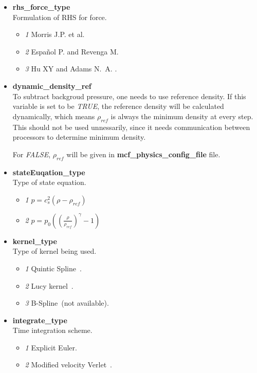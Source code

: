 \documentclass[a4paper,10pt]{article}
\begin{document}
\begin{itemize}
\item
\textbf{rhs\_force\_type} \\
Formulation of RHS for force.
\begin{itemize}
 \item \textit{1} Morris J.P. et al. \cite{Morris1997}
 \item \textit{2} Espa\~{n}ol P. and  Revenga M. \cite{Espanol2003}
 \item \textit{3} Hu XY and Adams N.~A.  \cite{Hu2006a}.
\end{itemize}

\item
\textbf{dynamic\_density\_ref}\\
To subtract backgroud pressure,
one needs to use reference density.
If this variable is set to be \textit{TRUE},
the reference density will be calculated dynamically,
which means \textbf{$\rho_{ref}$} is always the minimum
density at every step.
This should not be used unnessarily,
since it needs communication between processors
to determine minimum density.

For \textit{FALSE}, \textbf{$\rho_{ref}$} will be given
in \textbf{mcf\_physics\_config\_file} file.

\item
\textbf{stateEuqation\_type}\\
Type of state equation.
\begin{itemize}
 \item \textit{1} $p=c_s^2(\rho-\rho_{ref})$ 
 \cite{Morris1997}
 \item \textit{2} $p=p_0\left(\left(\frac{\rho}{\rho_{ref}}\right)^{\gamma}-1 \right)$
 \cite{Monaghan1994}
\end{itemize}

\item
\textbf{kernel\_type}\\
Type of kernel being used.

\begin{itemize}
 \item \textit{1} Quintic Spline~\cite{Morris1997}.
 \item \textit{2} Lucy kernel~\cite{Lucy1977}.
 \item \textit{3} B-Spline~(not available).
\end{itemize}

\item
\textbf{integrate\_type}\\
Time integration scheme.
\begin{itemize}
 \item \textit{1} Explicit Euler.
 \item \textit{2} Modified velocity Verlet~\cite{Groot1997}.
\end{itemize}


\end{itemize}
\end{document}

